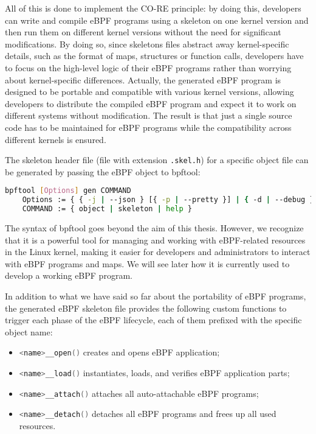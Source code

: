 All of this is done to implement the CO-RE principle: by doing this, developers can write and compile eBPF programs using a skeleton on one kernel version and then run them on different kernel versions without the need for significant modifications.
By doing so, since skeletons files abstract away kernel-specific details, such as the format of maps, structures or function calls, developers have to focus on the high-level logic of their eBPF programs rather than worrying about kernel-specific differences.
Actually, the generated eBPF program is designed to be portable and compatible with various kernel versions, allowing developers to distribute the compiled eBPF program and expect it to work on different systems without modification.
The result is that just a single source code has to be maintained for eBPF programs while the compatibility across different kernels is ensured.

The skeleton header file (file with extension \colorbox{backcolour}{\lstinline[style=highlight, language=bash]|.skel.h|}) for a specific object file can be generated by passing the eBPF object to bpftool:

\begin{lstlisting}[style=commandline, language=bash, caption={bpftool command syntax}]
	bpftool [Options] gen COMMAND
	Options := { { -j | --json } [{ -p | --pretty }] | { -d | --debug } | { -L | --use-loader } }
	COMMAND := { object | skeleton | help }
\end{lstlisting}

The syntax of bpftool goes beyond the aim of this thesis.
However, we recognize that it is a powerful tool for managing and working with eBPF-related resources in the Linux kernel, making it easier for developers and administrators to interact with eBPF programs and maps.
We will see later how it is currently used to develop a working eBPF program.

In addition to what we have said so far about the portability of eBPF programs, the generated eBPF skeleton file provides the following custom functions to trigger each phase of the eBPF lifecycle, each of them prefixed with the specific object name:

\begin{itemize}
	\item 
		\colorbox{backcolour}{\lstinline[style=cstyle, language=C]|<name>__open()|} creates and opens eBPF application;
	\item 
		\colorbox{backcolour}{\lstinline[style=cstyle, language=C]|<name>__load()|} instantiates, loads, and verifies eBPF application parts;
	\item 
		\colorbox{backcolour}{\lstinline[style=cstyle, language=C]|<name>__attach()|} attaches all auto-attachable eBPF programs;
	\item 	
		\colorbox{backcolour}{\lstinline[style=cstyle, language=C]|<name>__detach()|} detaches all eBPF programs and frees up all used resources.
\end{itemize}

